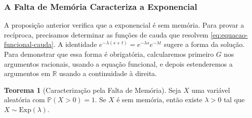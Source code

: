 \documentclass[12pt,portuguese]{article}
\theoremstyle{definition}
\newtheorem{theorem}{Teorema}
\theoremstyle{plainexercise}
\theoremstyle{starredexercise}
\theoremstyle{definition}
\begin{document}
\subsubsection{A Falta de Memória Caracteriza a Exponencial}

A proposição anterior verifica que a exponencial é sem memória. Para
provar a recíproca, precisamos determinar as funções de cauda que resolvem
\eqref{eq:equacao-funcional-cauda}. A identidade
$e^{-\lambda(s+t)}=e^{-\lambda s}e^{-\lambda t}$ sugere a forma da
solução. Para demonstrar que essa forma é obrigatória, calcularemos
primeiro $G$ nos argumentos racionais, usando a equação funcional, e
depois estenderemos a argumentos em $\mathbb{R}$ usando a continuidade à direita.

\begin{theorem}[Caracterização pela Falta de Memória]\label{thm:caracterizacao-falta-memoria}
Seja $X$ uma variável aleatória com $\mathbb{P}(X>0)=1$. Se $X$ é sem
memória, então existe $\lambda>0$ tal que $X\sim\mathrm{Exp}(\lambda)$.
\end{theorem}
\end{document}
